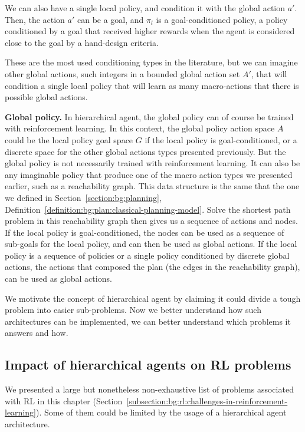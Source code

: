 We can also have a single local policy, and condition it with the global action $a'$.
Then, the action $a'$ can be a goal, and $\pi_l$ is a goal-conditioned policy, a policy conditioned by a goal that
received higher rewards when the agent is considered close to the goal by a hand-design criteria.

These are the most used conditioning types in the literature, but we can imagine other global actions, such integers in
a bounded global action set $A'$, that will condition a single local policy that will learn as many macro-actions that
there is possible global actions.

\textbf{Global policy.} In hierarchical agent, the global policy can of course be trained with reinforcement learning.
In this context, the global policy action space $A$ could be the local policy goal space $G$ if the local policy is
goal-conditioned, or a discrete space for the other global actions types presented previously.
But the global policy is not necessarily trained with reinforcement learning.
It can also be any imaginable policy that produce one of the macro action types we presented earlier, such as a 
reachability graph.
This data structure is the same that the one we defined in Section~\ref{section:bg:planning},
Definition~\ref{definition:bg:plan:classical-planning-model}.
Solve the shortest path problem in this reachability graph then gives us a sequence of actions and nodes.
If the local policy is goal-conditioned, the nodes can be used as a sequence of sub-goals for the local policy, and can
then be used as global actions.
If the local policy is a sequence of policies or a single policy conditioned by discrete global actions, the actions
that composed the plan (the edges in the reachability graph), can be used as global actions.

We motivate the concept of hierarchical agent by claiming it could divide a tough problem into easier sub-problems.
Now we better understand how such architectures can be implemented, we can better understand which problems it answers
and how.

\subsection{Impact of hierarchical agents on RL problems}\label{subsection:bg:plan-rl:impact-on-rl-problems}

We presented a large but nonetheless non-exhaustive list of problems associated with RL in this chapter
(Section~\ref{subsection:bg:rl:challenges-in-reinforcement-learning}).
Some of them could be limited by the usage of a hierarchical agent architecture.

